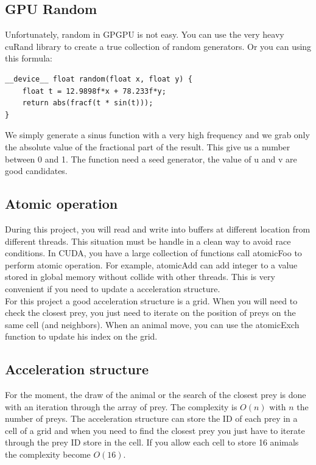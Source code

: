 \documentclass{article}
\begin{document}
\subsection{GPU Random}
Unfortunately, random in GPGPU is not easy. You can use the very heavy cuRand library to create a true collection of random generators. Or you can using this formula:
\begin{lstlisting}
__device__ float random(float x, float y) {
	float t = 12.9898f*x + 78.233f*y;
	return abs(fracf(t * sin(t)));
}
\end{lstlisting}
We simply generate a sinus function with a very high frequency and we grab only the absolute value of the fractional part of the result. This give us a number between 0 and 1. The function need a seed generator, the value of u and v are good candidates.

\subsection{Atomic operation}
During this project, you will read and write into buffers at different location from different threads. This situation must be handle in a clean way to avoid race conditions. In CUDA, you have a large collection of functions call atomicFoo to perform atomic operation. For example, atomicAdd can add integer to a value stored in global memory without collide with other threads. This is very convenient if you need to update a acceleration structure.\\
For this project a good acceleration structure is a grid. When you will need to check the closest prey, you just need to iterate on the position of preys on the same cell (and neighbors). When an animal move, you can use the atomicExch function to update his index on the grid.

\subsection{Acceleration structure}
For the moment, the draw of the animal or the search of the closest prey is done with an iteration through the array of prey. The complexity is $O(n)$ with $n$ the number of preys. The acceleration structure can store the ID of each prey in a cell of a grid and when you need to find the closest prey you just have to iterate through the prey ID store in the cell. If you allow each cell to store 16 animals the complexity become $O(16)$. 
\end{document}
